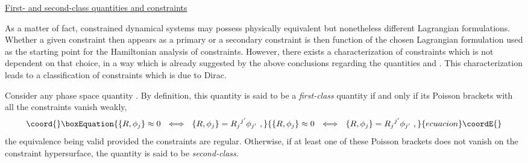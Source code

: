 \documentclass[a4paper,11pt]{article}
\begin{document}
\vspace{10pt}

\noindent\underline{First- and second-class quantities and constraints}

\vspace{5pt}

As a matter of fact, constrained dynamical systems may possess physically
equivalent but nonetheless different Lagrangian formulations. Whether a
given constraint then appears as a primary or a secondary constraint is
then function of the chosen Lagrangian formulation used as the starting
point for the Hamiltonian analysis of constraints. However, there exists
a characterization of constraints which is not dependent on that choice,
in a way which is already suggested by the above conclusions regarding the
quantities \coordHE{} and \myHighlight{$\phi_\alpha$}\coordHE{}. This characterization leads to a 
classification of constraints which is due to Dirac.\cite{Dirac}

Consider any phase space quantity \coordHE{}. By definition,
this quantity is said to be a {\sl first-class\/} quantity if and only if
its Poisson brackets with all the constraints \coordHE{} vanish weakly,
\begin{equation}\coord{}\boxEquation{
\{R,\phi_j\}\approx 0\ \ \Longleftrightarrow\ \ 
\{R,\phi_j\}={R_j}^{j'}\phi_{j'}\ ,
}{
\{R,\phi_j\}\approx 0\ \ \Longleftrightarrow\ \ 
\{R,\phi_j\}={R_j}^{j'}\phi_{j'}\ ,
}{ecuacion}\coordE{}\end{equation}
the equivalence being valid provided the constraints are regular.
Otherwise, if at least one of these Poisson brackets does not vanish
on the constraint hypersurface, the quantity \myHighlight{$R$}\coordHE{} is said to be
{\sl second-class\/}.
\end{document}
